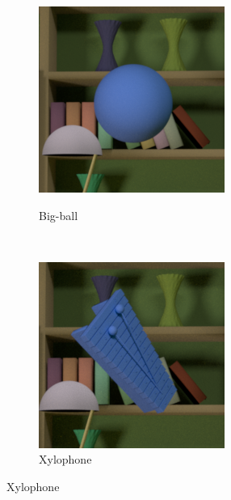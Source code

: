 \documentclass{jov}
\begin{document}
\begin{figure}
\centering
    \begin{subfigure}[b]{0.14 \textwidth}
        \caption{Big-ball}
        \includegraphics[width=\textwidth]{../FiguresDraft5/Figure3/Figure3_a.png}
        \label{fig:libraryWithBigBall}
    \end{subfigure}
     ~ 
    \begin{subfigure}[b]{0.14 \textwidth}
        \caption{Xylophone}
        \includegraphics[width=\textwidth]{../FiguresDraft5/Figure3/Figure3_b.png}

\end{subfigure}
\end{figure}
\end{document}
